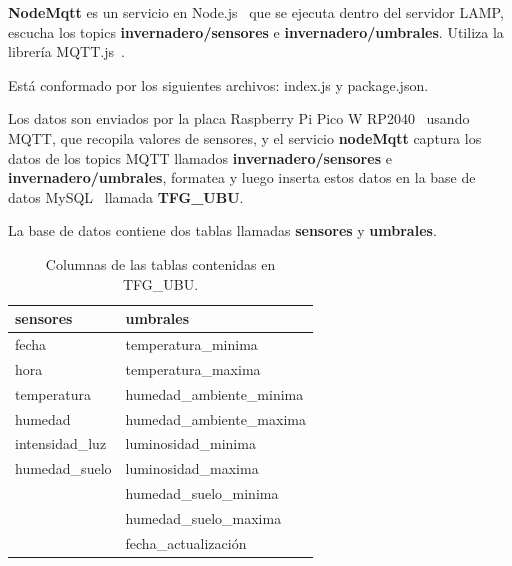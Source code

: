 \textbf{NodeMqtt} es un servicio en Node.js~\cite{misc:Nodejs} que se ejecuta dentro del servidor LAMP, escucha los topics \textbf{invernadero/sensores} e \textbf{invernadero/umbrales}. Utiliza la librería MQTT.js~\cite{misc:MQTTjs}.

Está conformado por los siguientes archivos: index.js y package.json.


Los datos son enviados por la placa Raspberry Pi Pico W RP2040~\cite{misc:RPiPicoW} usando MQTT, que recopila valores de sensores, y el servicio \textbf{nodeMqtt} captura los datos de los topics MQTT llamados \textbf{invernadero/sensores} e \textbf{invernadero/umbrales}, formatea y luego inserta estos datos en la base de datos MySQL~\cite{misc:Mysql} llamada \textbf{TFG\_UBU}.

La base de datos contiene dos tablas llamadas \textbf{sensores} y \textbf{umbrales}.

\begin{table}[htbp]
\begin{center}
	\caption{Columnas de las tablas contenidas en TFG\_UBU.}
\begin{tabular}{|l|l|}
\hline
\rowcolor[HTML]{C0C0C0} 
\textbf{sensores} & \textbf{umbrales}\\ \hline
fecha & temperatura\_minima \\ \hline
hora & temperatura\_maxima \\ \hline
temperatura & humedad\_ambiente\_minima \\ \hline
humedad & humedad\_ambiente\_maxima \\ \hline
intensidad\_luz & luminosidad\_minima \\ \hline
humedad\_suelo & luminosidad\_maxima \\ \hline
			   & humedad\_suelo\_minima \\ \hline
			   & humedad\_suelo\_maxima \\ \hline
			   & fecha\_actualización \\ \hline
\end{tabular}
\end{center}
\end{table}

